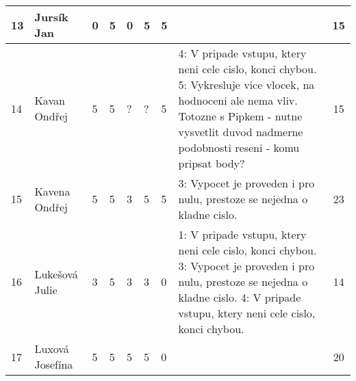 \documentclass[landscape, 12pt]{article}
\begin{document}
\begin{longtable}{|l l | C{0.7cm} | C{0.7cm} | C{0.7cm} | C{0.7cm} | C{0.7cm} | L{15cm} |c|}
  13 & Jursík Jan         &       0 &       5 &       0 &       5 &       5 &                                                                                                                                                                                                                                                                                                                                                                                      &       15 \\
\hline

  14 & Kavan Ondřej       &       5 &       5 &       ? &       ? &       5 & 4: V pripade vstupu, ktery neni cele cislo, konci chybou. 5: Vykresluje vice vlocek, na hodnoceni ale nema vliv.       Totozne s Pipkem - nutne vysvetlit duvod nadmerne podobnosti reseni - komu pripsat body?                                                                                                                                                                                                                                                                                             &       15 \\
\hline

  15 & Kavena Ondřej      &       5 &       5 &       3 &       5 &       5 & 3: Vypocet je proveden i pro nulu, prestoze se nejedna o kladne cislo.                                                                                                                                                                                                                                                                                                                  &       23 \\
\hline

  16 & Lukešová Julie     &       3 &       5 &       3 &       3 &       0 & 1: V pripade vstupu, ktery neni cele cislo, konci chybou. 3: Vypocet je proveden i pro nulu, prestoze se nejedna o kladne cislo. 4: V pripade vstupu, ktery neni cele cislo, konci chybou.                                                                                                                                                                                                          &       14 \\
\hline

  17 & Luxová Josefína    &       5 &       5 &       5 &       5 &       0 &                                                                                                                                                                                                                                                                                                                                                                                      &       20 \\
\hline


\end{longtable}
\end{document}
